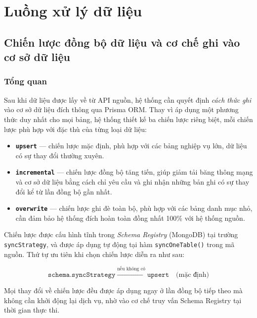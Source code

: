 \newpage

\section{Luồng xử lý dữ liệu}
\subsection{Chiến lược đồng bộ dữ liệu và cơ chế ghi vào cơ sở dữ liệu}
\label{sec:sync-strategy}

\subsubsection{Tổng quan}

Sau khi dữ liệu được lấy về từ API nguồn, hệ thống cần quyết định \textit{cách thức ghi} vào cơ sở dữ liệu đích thông qua Prisma ORM. Thay vì áp dụng một phương thức duy nhất cho mọi bảng, hệ thống thiết kế ba chiến lược riêng biệt, mỗi chiến lược phù hợp với đặc thù của từng loại dữ liệu:

\begin{itemize}
  \item \textbf{\texttt{upsert}} — chiến lược mặc định, phù hợp với các bảng nghiệp vụ lớn, dữ liệu có sự thay đổi thường xuyên.
  \item \textbf{\texttt{incremental}} — chiến lược đồng bộ tăng tiến, giúp giảm tải băng thông mạng và cơ sở dữ liệu bằng cách chỉ yêu cầu và ghi nhận những bản ghi có sự thay đổi kể từ lần đồng bộ gần nhất.
  \item \textbf{\texttt{overwrite}} — chiến lược ghi đè toàn bộ, phù hợp với các bảng danh mục nhỏ, cần đảm bảo hệ thống đích hoàn toàn đồng nhất 100\% với hệ thống nguồn.
\end{itemize}

Chiến lược được cấu hình tĩnh trong \textit{Schema Registry} (MongoDB) tại trường \texttt{syncStrategy}, và được áp dụng tự động tại hàm \texttt{syncOneTable()} trong mã nguồn. Thứ tự ưu tiên khi chọn chiến lược diễn ra như sau:

\[
  \texttt{schema.syncStrategy}
  \;\xrightarrow{\text{nếu không có}}\;
  \texttt{upsert} \quad \text{(mặc định)}
\]

Mọi thay đổi về chiến lược đều được áp dụng ngay ở lần đồng bộ tiếp theo mà không cần khởi động lại dịch vụ, nhờ vào cơ chế truy vấn Schema Registry tại thời gian thực thi.

